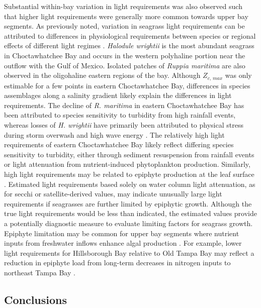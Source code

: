 \documentclass[letterpaper,12pt,oneside]{article}\usepackage[]{graphicx}\usepackage[]{color}
\begin{document}
Substantial within-bay variation in light requirements was also observed such that higher light requirements were generally more common towards upper bay segments.  As previously noted, variation in seagrass light requirements can be attributed to differences in physiological requirements between species or regional effects of different light regimes \citep{Choice14}.  \textit{Halodule wrightii} is the most abundant seagrass in Choctawhatchee Bay and occurs in the western polyhaline portion near the outflow with the Gulf of Mexico.  Isolated patches of \textit{Ruppia maritima} are also observed in the oligohaline eastern regions of the bay. Although $Z_{c,\,max}$ was only estimable for a few points in eastern Choctawhatchee Bay, differences in species assemblages along a salinity gradient likely explain the differences in light requirements. The decline of \textit{R. maritima} in eastern Choctawhatchee Bay has been attributed to species sensitivity to turbidity from high rainfall events, whereas losses of \textit{H. wrightii} have primarily been attributed to physical stress during storm overwash and high wave energy .  The relatively high light requirements of eastern Choctawhatchee Bay likely reflect differing species sensitivity to turbidity, either through sediment resuspension from rainfall events or light attenuation from nutrient-induced phytoplankton production.  Similarly, high light requirements may be related to epiphyte production at the leaf surface \citep{Kemp04}.  Estimated light requirements based solely on water column light attenuation, as for secchi or satellite-derived values, may indicate unusually large light requirements if seagrasses are further limited by epiphytic growth.  Although the true light requirements would be less than indicated, the estimated values provide a potentially diagnostic measure to evaluate limiting factors for seagrass growth.  Epiphyte limitation may be common for upper bay segments where nutrient inputs from freshwater inflows enhance algal production \citep{Kemp04}.  For example, lower light requirements for Hillsborough Bay relative to Old Tampa Bay may reflect a reduction in epiphyte load from long-term decreases in nitrogen inputs to northeast Tampa Bay \citep{Dawes10}.

\subsection{Conclusions}
\end{document}
